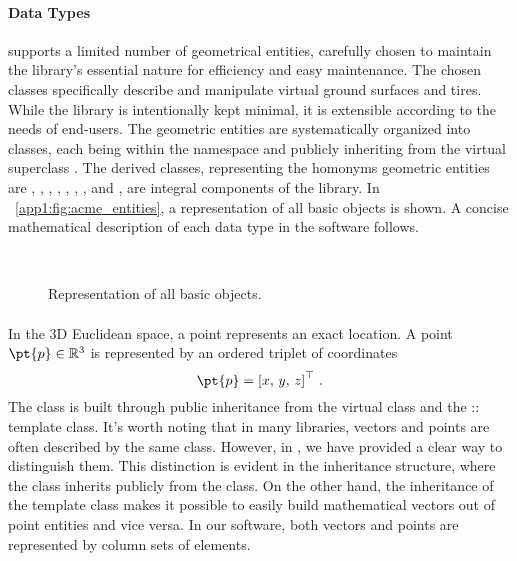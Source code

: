 \paragraph{Data Types}
\Acme{} supports a limited number of geometrical entities, carefully chosen to maintain the library's essential nature for efficiency and easy maintenance. The chosen classes specifically describe and manipulate virtual ground surfaces and tires. While the library is intentionally kept minimal, it is extensible according to the needs of end-users. The geometric entities are systematically organized into classes, each being within the \Acme{} namespace and publicly inheriting from the virtual superclass \Entity{}. The derived classes, representing the homonyms geometric entities are \Point{}, \Line{}, \Ray{}, \Plane{}, \Segment{}, \Triangle{}, \Disk{}, and \Ball{}, are integral components of the library. In \figurename{}~\ref{app1:fig:acme_entities}, a representation of all \Acme{} basic \Entity{} objects is shown. A concise mathematical description of each data type in the software follows.

\begin{figure}[!ht]
  \centering
  \def\svgwidth{9cm}
   \\[1.0em]
  \def\svgwidth{9cm}
  
  \caption{Representation of all \Acme{} basic \Entity{} objects.}
  \label{app1:acme_entities}
\end{figure}

\paragraph{\Point{}}
In the \ac{3D} Euclidean space, a point represents an exact location. A point $\pt{p} \in \mathbb{R}^3$ is represented by an ordered triplet of coordinates
%
\begin{equation*}
  \pt{p} = \left[x, \, y, \, z\right]^{\top} \, \text{.}
\end{equation*}
%
The \Point{} class is built through public inheritance from the virtual class \Entity{} and the \Eigen{}::\MatrixBase{} template class. It's worth noting that in many \cpp{} libraries, vectors and points are often described by the same class. However, in \Acme{}, we have provided a clear way to distinguish them. This distinction is evident in the inheritance structure, where the \Point{} class inherits publicly from the \Entity{} class. On the other hand, the inheritance of the \MatrixBase{} template class makes it possible to easily build mathematical vectors out of point entities and vice versa. In our software, both vectors and points are represented by column sets of elements.

